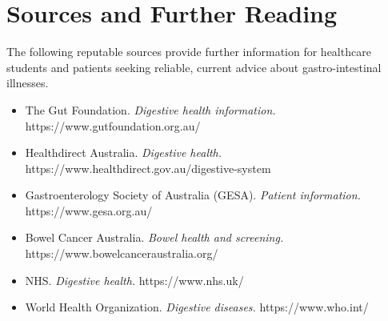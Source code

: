 \section*{Sources and Further Reading}
The following reputable sources provide further information for healthcare students and patients seeking reliable, current advice about gastro-intestinal illnesses.
\begin{itemize}
    \item The Gut Foundation. \textit{Digestive health information.} https://www.gutfoundation.org.au/
    \item Healthdirect Australia. \textit{Digestive health.} https://www.healthdirect.gov.au/digestive-system
    \item Gastroenterology Society of Australia (GESA). \textit{Patient information.} https://www.gesa.org.au/
    \item Bowel Cancer Australia. \textit{Bowel health and screening.} https://www.bowelcanceraustralia.org/
    \item NHS. \textit{Digestive health.} https://www.nhs.uk/
    \item World Health Organization. \textit{Digestive diseases.} https://www.who.int/
\end{itemize}
